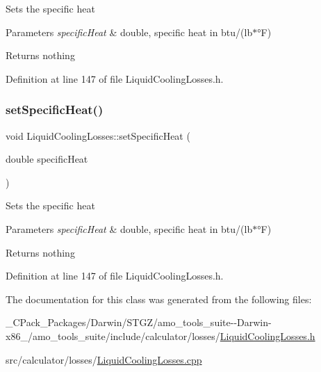 Sets the specific heat


\begin{DoxyParams}{Parameters}
{\em specific\+Heat} & double, specific heat in btu/(lb$\ast$°F)\\
\hline
\end{DoxyParams}
\begin{DoxyReturn}{Returns}
nothing 
\end{DoxyReturn}


Definition at line 147 of file Liquid\+Cooling\+Losses.\+h.

\mbox{\label{class_liquid_cooling_losses_a38ff1ff4dc0de69c72db094bf2259993}} 
\subsubsection{\texorpdfstring{set\+Specific\+Heat()}{setSpecificHeat()}\hspace{0.1cm}{\footnotesize\ttfamily [3/3]}}
{\footnotesize\ttfamily void Liquid\+Cooling\+Losses\+::set\+Specific\+Heat (\begin{DoxyParamCaption}\item[{double}]{specific\+Heat }\end{DoxyParamCaption})\hspace{0.3cm}{\ttfamily [inline]}}

Sets the specific heat


\begin{DoxyParams}{Parameters}
{\em specific\+Heat} & double, specific heat in btu/(lb$\ast$°F)\\
\hline
\end{DoxyParams}
\begin{DoxyReturn}{Returns}
nothing 
\end{DoxyReturn}


Definition at line 147 of file Liquid\+Cooling\+Losses.\+h.



The documentation for this class was generated from the following files\+:\begin{DoxyCompactItemize}
\item 
\+\_\+\+C\+Pack\+\_\+\+Packages/\+Darwin/\+S\+T\+G\+Z/amo\+\_\+tools\+\_\+suite-\/-\/\+Darwin-\/x86\+\_/amo\+\_\+tools\+\_\+suite/include/calculator/losses/\hyperlink{___c_pack___packages_2_darwin_2_s_t_g_z_2amo__tools__suite--_darwin-x86__64_2amo__tools__suite_2cdd1b9218cec46d428c4e8ed55a2f82a}{Liquid\+Cooling\+Losses.\+h}\item 
src/calculator/losses/\hyperlink{_liquid_cooling_losses_8cpp}{Liquid\+Cooling\+Losses.\+cpp}\end{DoxyCompactItemize}
